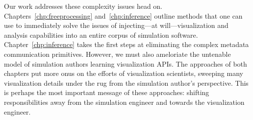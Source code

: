 Our work addresses these complexity issues head on.
Chapters~\ref{chp:freeprocessing} and~\ref{chp:inference} outline
methods that one can use to immediately solve the issues of
injecting---at will---visualization and analysis capabilities into an
entire corpus of simulation software.  Chapter~\ref{chp:inference}
takes the first steps at eliminating the complex metadata communication
primitives.  However, we must also ameloriate the untenable model of
simulation authors learning visualization APIs.  The approaches of both
chapters put more onus on the efforts of visualization scientists,
sweeping many visualization details under the rug from the simulation
author's perspective.  This is perhaps the most important message of
these approaches: shifting responsibilities away from the simulation
engineer and towards the visualization engineer.
